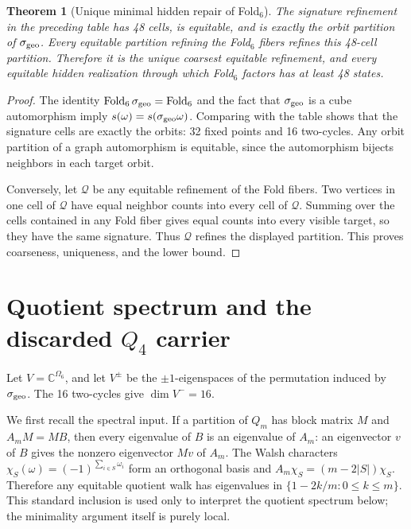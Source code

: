 \documentclass[12pt,a4paper]{article}
\theoremstyle{plain}
\newtheorem{theorem}{Theorem}[section]
\theoremstyle{definition}
\numberwithin{equation}{section}
\newcommand{\Fold}{\operatorname{Fold}}
\newcommand{\CC}{\mathbb C}
\begin{document}
\setcounter{theorem}{22}
\begin{theorem}[Unique minimal hidden repair of Fold$_6$]\label{thm:headline}\label{thm:window6-minimal-equitable-refinement}
The signature refinement in the preceding table has 48 cells, is equitable, and is
exactly the orbit partition of \(\sigma_{\rm geo}\).  Every equitable partition refining
the Fold$_6$ fibers refines this 48-cell partition.  Therefore it is the unique coarsest
equitable refinement, and every equitable hidden realization through which Fold$_6$
factors has at least 48 states.
\end{theorem}
\begin{proof}
The identity \(\Fold_6\sigma_{\rm geo}=\Fold_6\) and the fact that \(\sigma_{\rm geo}\)
is a cube automorphism imply \(s(\omega)=s(\sigma_{\rm geo}\omega)\).  Comparing with
the table shows that the signature cells are exactly the orbits: 32 fixed points and
16 two-cycles.  Any orbit partition of a graph automorphism is equitable, since the
automorphism bijects neighbors in each target orbit.

Conversely, let \(\mathcal Q\) be any equitable refinement of the Fold fibers.  Two
vertices in one cell of \(\mathcal Q\) have equal neighbor counts into every cell of
\(\mathcal Q\).  Summing over the cells contained in any Fold fiber gives equal counts
into every visible target, so they have the same signature.  Thus \(\mathcal Q\) refines
the displayed partition.  This proves coarseness, uniqueness, and the lower bound.
\end{proof}

\section{Quotient spectrum and the discarded $Q_4$ carrier}\label{sec:spectrum}
Let \(V=\CC^{\Omega_6}\), and let \(V^\pm\) be the \(\pm1\)-eigenspaces of the
permutation induced by \(\sigma_{\rm geo}\).  The 16 two-cycles give \(\dim V^-=16\).

We first recall the spectral input.  If a partition of \(Q_m\) has block matrix \(M\)
and \(A_mM=MB\), then every eigenvalue of \(B\) is an eigenvalue of \(A_m\): an
eigenvector \(v\) of \(B\) gives the nonzero eigenvector \(Mv\) of \(A_m\).  The Walsh
characters \(\chi_S(\omega)=(-1)^{\sum_{i\in S}\omega_i}\) form an orthogonal basis and
\(A_m\chi_S=(m-2|S|)\chi_S\).  Therefore any equitable quotient walk has eigenvalues
in \(\{1-2k/m:0\le k\le m\}\).  This standard inclusion is used only to interpret
the quotient spectrum below; the minimality argument itself is purely local.
\end{document}
